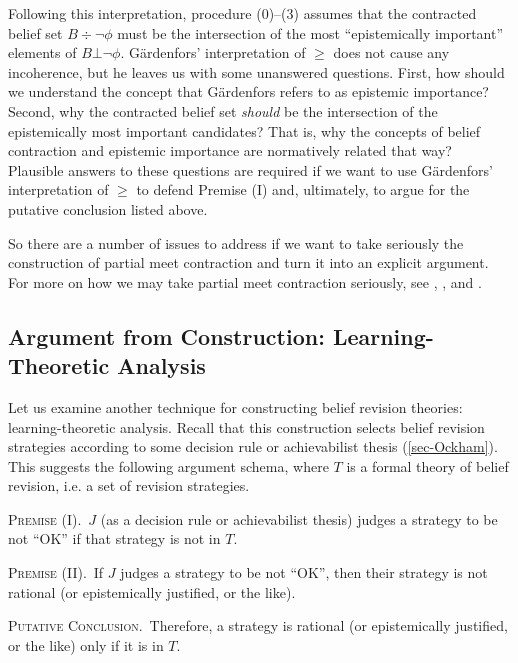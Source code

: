 \ed Following this interpretation, procedure ($0$)--($3$) assumes that the contracted belief set $B \div \neg\phi$ must be the intersection of the most ``epistemically important'' elements of $B\bot\neg\phi$. G\"{a}rdenfors' interpretation of $\ge$ does not cause any incoherence, but he leaves us with some unanswered questions. First, how should we understand the concept that G\"{a}rdenfors refers to as epistemic importance? Second, why the contracted belief set {\em should} be the intersection of the epistemically most important candidates? That is, why the concepts of belief contraction and epistemic importance are normatively related that way? Plausible answers to these questions are required if we want to use G\"{a}rdenfors' interpretation of $\ge$ to defend Premise (I) and, ultimately, to argue for the putative conclusion listed above.


So there are a number of issues to address if we want to take seriously the construction of partial meet contraction and turn it into an explicit argument. For more on how we may take partial meet contraction seriously, see \citet{gardenfors1984epistemic}, \citet{levi2004mild}, and \citet{arlo2006contraction}.


\subsection{Argument from Construction: Learning-Theoretic Analysis}\label{sec-arg-construction-2}



Let us examine another technique for constructing belief revision theories: learning-theoretic analysis. Recall that this construction selects belief revision strategies according to some decision rule or achievabilist thesis (\autoref{sec-Ockham}). This suggests the following argument schema, where $T$ is a formal theory of belief revision, i.e. a set of revision strategies.\op

	\xm \textsc{Premise (I).}\, $J$ (as a decision rule or achievabilist thesis) judges a strategy to be not ``OK'' if that strategy is not in $T$.

	\xm \textsc{Premise (II).}\, If $J$ judges a strategy to be not ``OK'', then their strategy is not rational (or epistemically justified, or the like).

	\xm \textsc{Putative Conclusion.}\, Therefore, a strategy is rational (or epistemically justified, or the like) only if it is in $T$.  

\ed 

